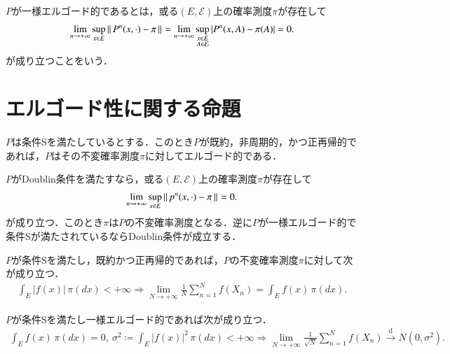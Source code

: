 	\begin{dfn}[一様エルゴード性]
		$P$が一様エルゴード的であるとは，或る$(E,\mathcal{E})$上の確率測度$\pi$が存在して
		\begin{align}
			\lim_{n \to +\infty} \operatorname*{sup}_{x \in E} \left\|\, P^n(x,\cdot) - \pi\, \right\|_{} = \lim_{n \to +\infty} \operatorname*{sup}_{\substack{x \in E \\ A \in \mathcal{E}}} \left| P^n(x,A) - \pi(A)\right| =0.
		\end{align}
		が成り立つことをいう．
	\end{dfn}
	
\section{エルゴード性に関する命題}
	\begin{prp}[エルゴード性]
		$P$は条件Sを満たしているとする．このとき$P$が既約，非周期的，かつ正再帰的であれば，$P$はその不変確率測度$\pi$に対してエルゴード的である．
	\end{prp}
	
	\begin{prp}[一様エルゴード性]
		$P$がDoublin条件を満たすなら，或る$(E,\mathcal{E})$上の確率測度$\pi$が存在して
		\begin{align}
			\lim_{n \to +\infty} \operatorname*{sup}_{x \in E} \left\|\, p^n(x,\cdot) - \pi\, \right\|_{} = 0.
		\end{align}
		が成り立つ．このとき$\pi$は$P$の不変確率測度となる．逆に$P$が一様エルゴード的で条件Sが満たされているならDoublin条件が成立する．
	\end{prp}
	
	\begin{prp}[大数の法則]
		$P$が条件Sを満たし，既約かつ正再帰的であれば，$P$の不変確率測度$\pi$に対して次が成り立つ．
		\begin{align}
			\int_E |f(x)|\, \pi(dx) < +\infty \Rightarrow \lim_{N \to +\infty} \frac{1}{N} \sum_{n=1}^{N} f(X_n) = \int_E f(x)\, \pi(dx).
		\end{align}
	\end{prp}
	
	\begin{prp}[中心極限定理]
		$P$が条件Sを満たし一様エルゴード的であれば次が成り立つ．
		\begin{align}
			\int_E f(x)\, \pi(dx) = 0,\ \sigma^2 \coloneqq \int_E |f(x)|^2\, \pi(dx) < +\infty 
			\Rightarrow \lim_{N \to +\infty} \frac{1}{\sqrt{N}} \sum_{n=1}^{N} f(X_n) \overset{\mathrm{d}}{\rightarrow} N(0,\sigma^2).
		\end{align}
	\end{prp}
	
	
	
	
	
	
	
	
	
	